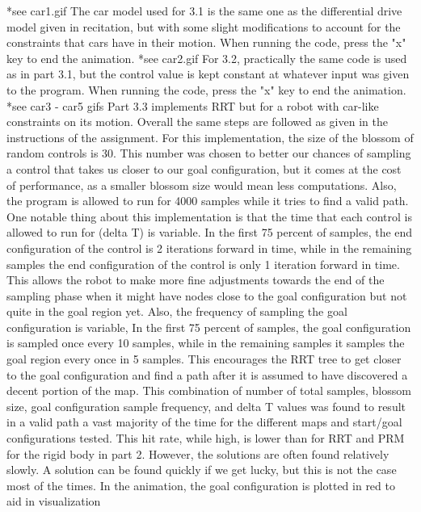 \documentclass{article}
\begin{document}
\newline
*see car1.gif
\newline
The car model used for 3.1 is the same one as the differential drive model given in recitation, but with some slight modifications to account for the constraints that cars have in their motion. When running the code, press the "x" key to end the animation.
\newline
*see car2.gif
\newline
For 3.2, practically the same code is used as in part 3.1, but the control value is kept constant at whatever input was given to the program. When running the code, press the "x" key to end the animation.
\newline
*see car3 - car5 gifs
\newline
Part 3.3 implements RRT but for a robot with car-like constraints on its motion. Overall the same steps are followed as given in the instructions of the assignment. For this implementation, the size of the blossom of random controls is 30. This number was chosen to better our chances of sampling a control that takes us closer to our goal configuration, but it comes at the cost of performance, as a smaller blossom size would mean less computations. Also, the program is allowed to run for 4000 samples while it tries to find a valid path. One notable thing about this implementation is that the time that each control is allowed to run for (delta T) is variable. In the first 75 percent of samples, the end configuration of the control is 2 iterations forward in time, while in the remaining samples the end configuration of the control is only 1 iteration forward in time. This allows the robot to make more fine adjustments towards the end of the sampling phase when it might have nodes close to the goal configuration but not quite in the goal region yet. Also, the frequency of sampling the goal configuration is variable, In the first 75 percent of samples, the goal configuration is sampled once every 10 samples, while in the remaining samples it samples the goal region every once in 5 samples. This encourages the RRT tree to get closer to the goal configuration and find a path after it is assumed to have discovered a decent portion of the map. This combination of number of total samples, blossom size, goal configuration sample frequency, and delta T values was found to result in a valid path a vast majority of the time for the different maps and start/goal configurations tested. This hit rate, while high, is lower than for RRT and PRM for the rigid body in part 2. However, the solutions are often found relatively slowly. A solution can be found quickly if we get lucky, but this is not the case most of the times. In the animation, the goal configuration is plotted in red to aid in visualization
\end{document}
